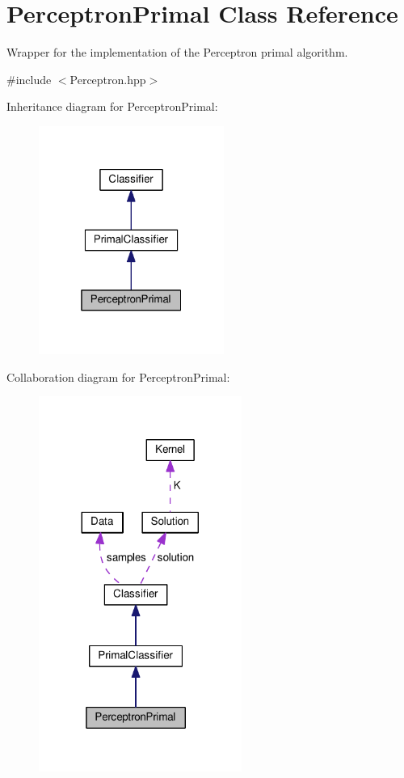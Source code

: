 \hypertarget{class_perceptron_primal}{}\section{Perceptron\+Primal Class Reference}
\label{class_perceptron_primal}


Wrapper for the implementation of the Perceptron primal algorithm.  




{\ttfamily \#include $<$Perceptron.\+hpp$>$}



Inheritance diagram for Perceptron\+Primal\+:\nopagebreak
\begin{figure}[H]
\begin{center}
\leavevmode
\includegraphics[width=172pt]{class_perceptron_primal__inherit__graph}
\end{center}
\end{figure}


Collaboration diagram for Perceptron\+Primal\+:
\nopagebreak
\begin{figure}[H]
\begin{center}
\leavevmode
\includegraphics[width=188pt]{class_perceptron_primal__coll__graph}
\end{center}
\end{figure}
